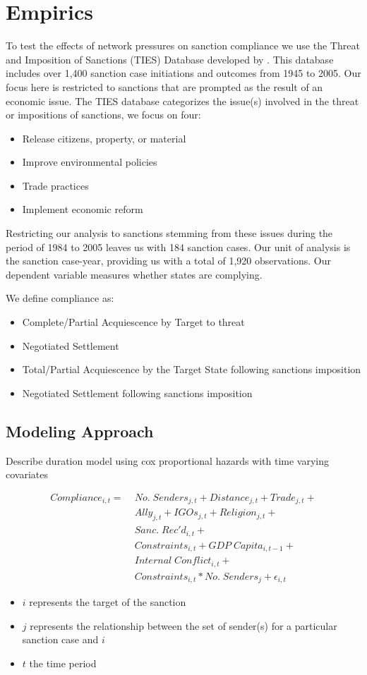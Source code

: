\section*{Empirics}
\label{empirics}

To test the effects of network pressures on sanction compliance we use the Threat and Imposition of Sanctions (TIES) Database developed by \citet{morgan2009threat}. This database includes over 1,400 sanction case initiations and outcomes from 1945 to 2005. Our focus here is restricted to sanctions that are prompted as the result of an economic issue. The TIES database categorizes the issue(s) involved in the threat or impositions of sanctions, we focus on four:

\begin{itemize}
	\item Release citizens, property, or material
	\item Improve environmental policies
	\item Trade practices
	\item Implement economic reform
\end{itemize}

Restricting our analysis to sanctions stemming from these issues during the period of 1984 to 2005 leaves us with 184 sanction cases. Our unit of analysis is the sanction case-year, providing us with a total of 1,920 observations. Our dependent variable measures whether states are complying. 


We define compliance as:
	\begin{itemize}
		\item Complete/Partial Acquiescence by Target to threat
		\item Negotiated Settlement
		\item Total/Partial Acquiescence by the Target State following sanctions imposition
		\item Negotiated Settlement following sanctions imposition
	\end{itemize}
	
\subsection{Modeling Approach} 

Describe duration model using cox proportional hazards with time varying covariates

\begin{align*}
		Compliance_{i,t} =\; & No. \; Senders_{j,t} + Distance_{j,t} + Trade_{j,t}  + \\
		 &Ally_{j,t} + IGOs_{j,t} + Religion_{j,t} +\\
 		 &Sanc. \; Rec'd_{i,t} + \\
		 &Constraints_{i,t} + GDP \; Capita_{i,t-1} +\\
		 & Internal \; Conflict_{i,t} +\\
		 &Constraints_{i,t}*No. \; Senders_{j} + \epsilon_{i,t}
	\end{align*}
	
\begin{itemize}
	\item $i$ represents the target of the sanction
	\item $j$ represents the relationship between the set of sender(s) for a particular sanction case and $i$
	\item $t$ the time period
\end{itemize}
